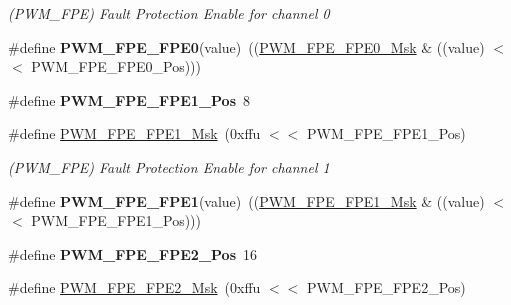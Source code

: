 \begin{DoxyCompactItemize}
\begin{DoxyCompactList}\small\item\em (P\+W\+M\+\_\+\+F\+PE) Fault Protection Enable for channel 0 \end{DoxyCompactList}\item 
\mbox{\label{group__SAMV71__PWM_gada304e1da29948064fdb0d3398e71dd7}} 
\#define {\bfseries P\+W\+M\+\_\+\+F\+P\+E\+\_\+\+F\+P\+E0}(value)~((\mbox{\hyperlink{group__SAMV71__PWM_ga883b1a6b32d3255fe62e1e584659cb30}{P\+W\+M\+\_\+\+F\+P\+E\+\_\+\+F\+P\+E0\+\_\+\+Msk}} \& ((value) $<$$<$ P\+W\+M\+\_\+\+F\+P\+E\+\_\+\+F\+P\+E0\+\_\+\+Pos)))
\item 
\mbox{\label{group__SAMV71__PWM_gaf8d476de94ddf131fcc23c23cbbf4402}} 
\#define {\bfseries P\+W\+M\+\_\+\+F\+P\+E\+\_\+\+F\+P\+E1\+\_\+\+Pos}~8
\item 
\mbox{\label{group__SAMV71__PWM_ga41c1d32975b17740532d30eb42912879}} 
\#define \mbox{\hyperlink{group__SAMV71__PWM_ga41c1d32975b17740532d30eb42912879}{P\+W\+M\+\_\+\+F\+P\+E\+\_\+\+F\+P\+E1\+\_\+\+Msk}}~(0xffu $<$$<$ P\+W\+M\+\_\+\+F\+P\+E\+\_\+\+F\+P\+E1\+\_\+\+Pos)
\begin{DoxyCompactList}\small\item\em (P\+W\+M\+\_\+\+F\+PE) Fault Protection Enable for channel 1 \end{DoxyCompactList}\item 
\mbox{\label{group__SAMV71__PWM_ga155166e5eb3a0258dbd1afe05a73e4dc}} 
\#define {\bfseries P\+W\+M\+\_\+\+F\+P\+E\+\_\+\+F\+P\+E1}(value)~((\mbox{\hyperlink{group__SAMV71__PWM_ga41c1d32975b17740532d30eb42912879}{P\+W\+M\+\_\+\+F\+P\+E\+\_\+\+F\+P\+E1\+\_\+\+Msk}} \& ((value) $<$$<$ P\+W\+M\+\_\+\+F\+P\+E\+\_\+\+F\+P\+E1\+\_\+\+Pos)))
\item 
\mbox{\label{group__SAMV71__PWM_ga21f498501f20a5815cbe734e7423e6f9}} 
\#define {\bfseries P\+W\+M\+\_\+\+F\+P\+E\+\_\+\+F\+P\+E2\+\_\+\+Pos}~16
\item 
\mbox{\label{group__SAMV71__PWM_ga3dbe9d68d6f74bdebf54e40585180117}} 
\#define \mbox{\hyperlink{group__SAMV71__PWM_ga3dbe9d68d6f74bdebf54e40585180117}{P\+W\+M\+\_\+\+F\+P\+E\+\_\+\+F\+P\+E2\+\_\+\+Msk}}~(0xffu $<$$<$ P\+W\+M\+\_\+\+F\+P\+E\+\_\+\+F\+P\+E2\+\_\+\+Pos)

\end{DoxyCompactItemize}
